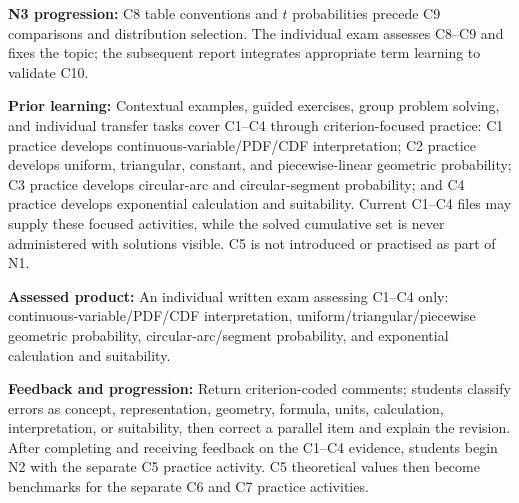 \documentclass[10pt,letterpaper]{article}
\newcommand{\labelled}[2]{\textbf{#1:} #2\par}
\newcommand{\plansection}[1]{\Needspace{8\baselineskip}\par\vspace{8pt}{\large\bfseries #1\par}\vspace{3pt}}
\newcommand{\plansubsection}[1]{\Needspace{7\baselineskip}\par\vspace{5pt}{\normalsize\bfseries #1\par}\vspace{1pt}}
\begin{document}
	\labelled{N3 progression}{C8 table conventions and $t$ probabilities precede C9 comparisons and distribution selection. The individual exam assesses C8--C9 and fixes the topic; the subsequent report integrates appropriate term learning to validate C10.}
	
	\plansection{6. Learning Evidences, Feedback, and Progression}
	\plansubsection{First Learning Evidence --- Individual C1--C4 written exam}
	\labelled{Prior learning}{Contextual examples, guided exercises, group problem solving, and individual transfer tasks cover C1--C4 through criterion-focused practice: C1 practice develops continuous-variable/PDF/CDF interpretation; C2 practice develops uniform, triangular, constant, and piecewise-linear geometric probability; C3 practice develops circular-arc and circular-segment probability; and C4 practice develops exponential calculation and suitability. Current C1--C4 files may supply these focused activities, while the solved cumulative set is never administered with solutions visible. C5 is not introduced or practised as part of N1.}
	\labelled{Assessed product}{An individual written exam assessing C1--C4 only: continuous-variable/PDF/CDF interpretation, uniform/triangular/piecewise geometric probability, circular-arc/segment probability, and exponential calculation and suitability.}
	\labelled{Feedback and progression}{Return criterion-coded comments; students classify errors as concept, representation, geometry, formula, units, calculation, interpretation, or suitability, then correct a parallel item and explain the revision. After completing and receiving feedback on the C1--C4 evidence, students begin N2 with the separate C5 practice activity. C5 theoretical values then become benchmarks for the separate C6 and C7 practice activities.}
	
\end{document}
